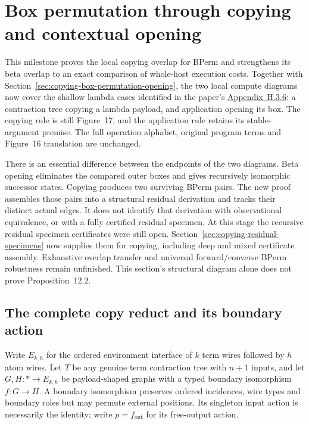\clearpage
\section{Box permutation through copying and contextual opening}
\label{sec:copying-box-permutation-overlaps}
This milestone proves the local copying overlap for BPerm and strengthens
its beta overlap to an exact comparison of whole-host execution costs.
Together with Section~\ref{sec:copying-box-permutation-opening}, the two local
compute diagrams now cover the shallow lambda cases identified in the paper's
\href{https://arxiv.org/html/1907.01257v5\#A8.SS3.SSS6}{Appendix~H.3.6}:
a contraction tree copying a lambda payload, and application opening its box.
The copying rule is still Figure~17, and the application rule retains its
stable-argument premise. The full operation alphabet, original program terms
and Figure~16 translation are unchanged.

There is an essential difference between the endpoints of the two diagrams.
Beta opening eliminates the compared outer boxes and gives recursively
isomorphic successor states. Copying produces two surviving BPerm pairs.
The new proof assembles those pairs into a structural residual derivation and
tracks their distinct actual edges. It does not identify that derivation with
observational equivalence, or with a fully certified residual specimen.
At this stage the recursive residual specimen certificates were still open.
Section~\ref{sec:copying-residual-specimens} now supplies them for copying,
including deep and mixed certificate assembly. Exhaustive overlap transfer
and universal forward/converse BPerm robustness remain unfinished. This
section's structural diagram alone does not prove Proposition~12.2.

\subsection{The complete copy reduct and its boundary action}
Write $E_{k,h}$ for the ordered environment interface of $k$ term wires followed
by $h$ atom wires. Let $T$ be any genuine term contraction tree with $n+1$
inputs, and let $G,H:*\to E_{k,h}$ be payload-shaped graphs with a typed boundary
isomorphism $f:G\to H$. A boundary isomorphism preserves ordered incidences,
wire types and boundary roles but may permute external positions. Its singleton
input action is necessarily the identity; write $p=f_{\mathrm{out}}$ for its
free-output action.


